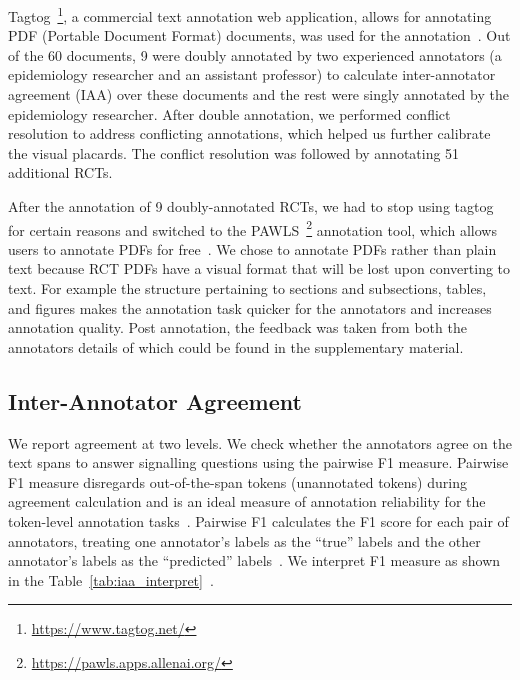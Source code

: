 \documentclass[sn-mathphys,Numbered]{sn-jnl}%
\theoremstyle{thmstyleone}%
\theoremstyle{thmstyletwo}%
\theoremstyle{thmstylethree}%
\begin{document}
Tagtog~\footnote{\url{https://www.tagtog.net/}}, a commercial text annotation web application, allows for annotating PDF (Portable Document Format) documents, was used for the annotation~\cite{cejuela2014tagtog}.
Out of the 60 documents, 9 were doubly annotated by two experienced annotators (a epidemiology researcher and an assistant professor) to calculate inter-annotator agreement (IAA) over these documents and the rest were singly annotated by the epidemiology researcher.
After double annotation, we performed conflict resolution to address conflicting annotations, which helped us further calibrate the visual placards.
The conflict resolution was followed by annotating 51 additional RCTs.


After the annotation of 9 doubly-annotated RCTs, we had to stop using tagtog for certain reasons and switched to the PAWLS~\footnote{\url{https://pawls.apps.allenai.org/}} annotation tool, which allows users to annotate PDFs for free~\cite{neumann2021pawls}.
We chose to annotate PDFs rather than plain text because RCT PDFs have a visual format that will be lost upon converting to text. 
For example the structure pertaining to sections and subsections, tables, and figures makes the annotation task quicker for the annotators and increases annotation quality.
Post annotation, the feedback was taken from both the annotators details of which could be found in the supplementary material. %
%
%
%
\subsection{Inter-Annotator Agreement}
\label{method:iaa}
%
We report agreement at two levels. 
We check whether the annotators agree on the text spans to answer signalling questions using the pairwise F1 measure.
Pairwise F1 measure disregards out-of-the-span tokens (unannotated tokens) during agreement calculation and is an ideal measure of annotation reliability for the token-level annotation tasks~\cite{deleger2012building}.
Pairwise F1 calculates the F1 score for each pair of annotators, treating one annotator's labels as the ``true'' labels and the other annotator's labels as the ``predicted'' labels~\cite{brandsen2020creating}.
We interpret F1 measure as shown in the Table~\ref{tab:iaa_interpret}~\cite{landis1977measurement}.
\end{document}
